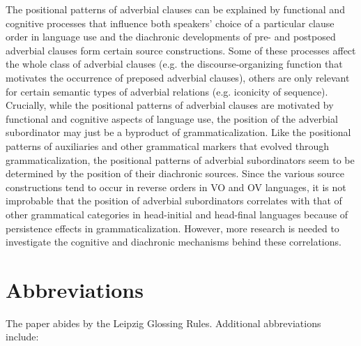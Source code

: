 \documentclass[output=paper]{langsci/langscibook}
\begin{document}
The positional patterns of adverbial clauses can be explained by functional and cognitive processes that influence both speakers’ choice of a particular clause order in language use and the diachronic developments of pre- and postposed adverbial clauses form certain source constructions. Some of these processes affect the whole class of adverbial clauses (e.g. the discourse-organizing function that motivates the occurrence of preposed adverbial clauses), others are only relevant for certain semantic types of adverbial relations (e.g. iconicity of sequence). Crucially, while the positional patterns of adverbial clauses are motivated by functional and cognitive aspects of language use, the position of the adverbial subordinator may just be a byproduct of grammaticalization. Like the positional patterns of auxiliaries and other grammatical markers that evolved through grammaticalization, the positional patterns of adverbial subordinators seem to be determined by the position of their diachronic sources. Since the various source constructions tend to occur in reverse orders in VO and OV languages, it is not improbable that the position of adverbial subordinators correlates with that of other grammatical categories in head-initial and head-final languages because of persistence effects in grammaticalization. However, more research is needed to investigate the cognitive and diachronic mechanisms behind these correlations.

\section{Abbreviations}

The paper abides by the Leipzig Glossing Rules. Additional abbreviations include:
\end{document}
